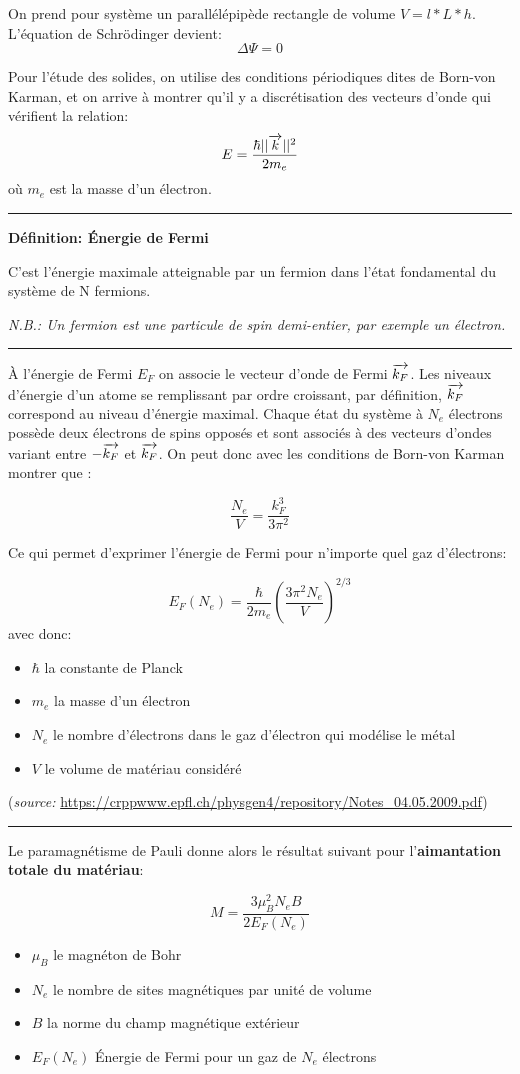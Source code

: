 \documentclass{report}
\begin{document}
On prend pour système un parallélépipède rectangle de volume $V = l*L*h$.
L'équation de Schrödinger devient:
$$\Delta \Psi = 0$$

Pour l'étude des solides, on utilise des conditions périodiques dites de Born-von Karman, et on arrive à montrer qu'il y a discrétisation des vecteurs d'onde qui vérifient la relation:
$$E = \frac{\hbar ||\overrightarrow{k}||^2}{2m_e}$$
où $m_e$ est la masse d'un électron.

\rule{\textwidth}{0.4pt}

\begin{center}
\textbf{Définition: Énergie de Fermi}
    
    C’est l’énergie maximale atteignable par un fermion dans l’état fondamental du système de N fermions.

\emph{N.B.: Un fermion est une particule de spin demi-entier, par exemple un électron.}    
\end{center}

\rule{\textwidth}{0.4pt}

À l'énergie de Fermi $E_F$ on associe le vecteur d'onde de Fermi $\overrightarrow{k_F}$. Les niveaux d'énergie d'un atome se remplissant par ordre croissant, par définition, $\overrightarrow{k_F}$ correspond au niveau d'énergie maximal. Chaque état du système à $N_e$ électrons possède deux électrons de spins opposés et sont associés à des vecteurs d'ondes variant entre $-\overrightarrow{k_F}$ et $\overrightarrow{k_F}$. On peut donc avec les conditions de Born-von Karman montrer que :

$$\frac{N_e}{V} = \frac{k_F^3}{3\pi^2}$$

Ce qui permet d'exprimer l'énergie de Fermi pour n'importe quel gaz d'électrons:


    $$E_F(N_e) = \frac{\hbar}{2m_e} \left(\frac{3\pi^2N_e}{V}\right)^{2/3}$$
avec donc:
    \begin{itemize}
        \item $\hbar$ la constante de Planck
        \item $m_e$ la masse d'un électron
        \item $N_e$ le nombre d'électrons dans le gaz d'électron qui modélise le métal
        \item $V$ le volume de matériau considéré
    \end{itemize}
(\emph{source: }\url{https://crppwww.epfl.ch/physgen4/repository/Notes_04.05.2009.pdf})

\rule{\textwidth}{0.4pt}
\begin{center}
Le paramagnétisme de Pauli donne alors le résultat suivant pour l'\textbf{aimantation totale du matériau}:

$$M = \frac{3\mu_B^2 N_e B}{2 E_F(N_e)}$$

\begin{itemize}
    \item $\mu_B$ le magnéton de Bohr
    \item $N_e$ le nombre de sites magnétiques par unité de volume
    \item $B$ la norme du champ magnétique extérieur
    \item $E_F(N_e)$ Énergie de Fermi pour un gaz de $N_e$ électrons
\end{itemize}    
\end{center}
\end{document}
